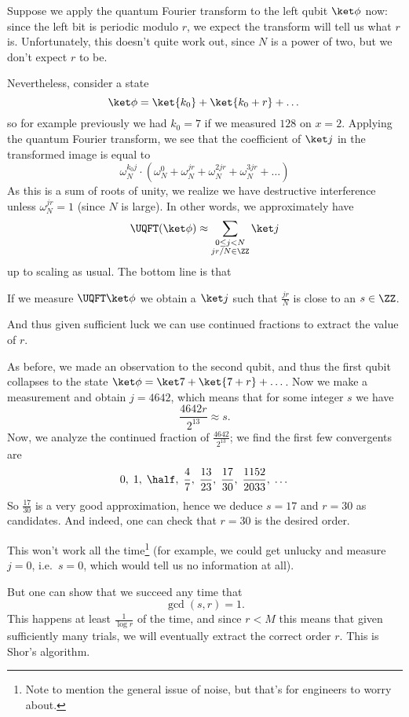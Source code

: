 Suppose we apply the quantum Fourier transform to the left qubit $\ket\phi$ now:
since the left bit is periodic modulo $r$, we expect the transform
will tell us what $r$ is.
Unfortunately, this doesn't quite work out, since $N$ is a power of two,
but we don't expect $r$ to be.

Nevertheless, consider a state
\[ \ket\phi = \ket{k_0} + \ket{k_0+r} + \dots \]
so for example previously we had $k_0=7$ if we measured $128$ on $x=2$.
Applying the quantum Fourier transform, we see that the
coefficient of $\ket j$ in the transformed image is equal to
\[
	\omega_N^{k_0j} \cdot
	\left( \omega_N^{0} + \omega_N^{jr} + \omega_N^{2jr}
	+ \omega_N^{3jr} + \dots \right)
\]
As this is a sum of roots of unity, we realize we have
destructive interference unless $\omega_N^{jr} = 1$ (since $N$ is large).
In other words, we approximately have
\[
	\UQFT(\ket\phi)
	\approx
	\sum_{\substack{0 \le j < N \\ jr/N \in \ZZ}} \ket j
\]
up to scaling as usual.
The bottom line is that
\begin{moral}
	If we measure $\UQFT\ket\phi$ we obtain a $\ket j$ such that
	$\frac{jr}{N}$ is close to an $s \in \ZZ$.
\end{moral}
And thus given sufficient luck we can use continued fractions
to extract the value of $r$.

\begin{example}
	[Finishing the factoring of $M = 77$]
	As before, we made an observation to the second qubit,
	and thus the first qubit collapses to the state
	$\ket\phi = \ket7 + \ket{7+r} + \dots$.
	Now we make a measurement and obtain $j = 4642$, which means that
	for some integer $s$ we have
	\[ \frac{4642r}{2^{13}} \approx s. \]
	Now, we analyze the continued fraction of $\frac{4642}{2^{13}}$;
	we find the first few convergents are
	\[
		0, \;
		1, \;
		\half, \;
		\frac{4}{7}, \;
		\frac{13}{23}, \;
		\frac{17}{30}, \;
		\frac{1152}{2033}, \;
		\dots
	\]
	So $\frac{17}{30}$ is a very good approximation,
	hence we deduce $s = 17$ and $r = 30$ as candidates.
	And indeed, one can check that $r = 30$ is the desired order.
\end{example}

This won't work all the time\footnote{%
	Note to mention the general issue of noise, but that's for 
	engineers to worry about.
} (for example, we could get unlucky and
measure $j=0$, i.e.\ $s=0$, which would tell us no information at all).

But one can show that we succeed any time that \[ \gcd(s,r) = 1. \]
This happens at least $\frac{1}{\log r}$ of the time,
and since $r < M$ this means that given sufficiently many trials,
we will eventually extract the correct order $r$.
This is Shor's algorithm.
